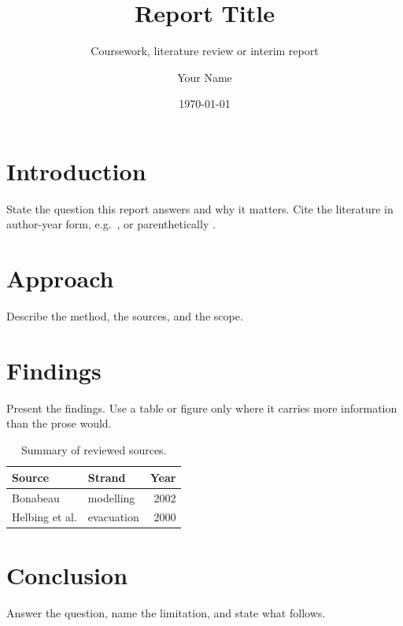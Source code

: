 \documentclass[11pt,a4paper]{article}
\title{Report Title}
\subtitle{Coursework, literature review or interim report}
\author{Your Name}
\date{\today}
\begin{document}
\uonreporttitle


\section{Introduction}

State the question this report answers and why it matters. Cite the
literature in author-year form, e.g.\ \textcite{bonabeau2002}, or
parenthetically \parencite{helbing2000}.

\section{Approach}

Describe the method, the sources, and the scope.

\section{Findings}

Present the findings. Use a table or figure only where it carries more
information than the prose would.

\begin{table}[htbp]
  \centering
  \caption{Summary of reviewed sources.}
  \label{tab:sources}
  \begin{tabular}{llr}
    \toprule
    Source & Strand & Year \\
    \midrule
    Bonabeau & modelling & 2002 \\
    Helbing et al. & evacuation & 2000 \\
    \bottomrule
  \end{tabular}
\end{table}

\section{Conclusion}

Answer the question, name the limitation, and state what follows.

\printbibliography[heading=bibintoc, title={References}]
\end{document}
